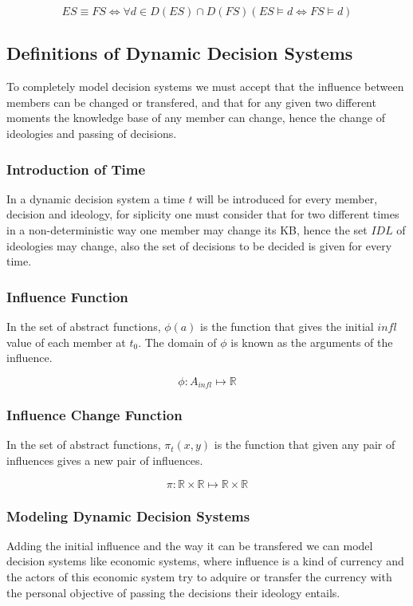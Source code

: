 $$ ES \equiv FS \iff \forall d \in D(ES) \cap D(FS) (ES \models d \iff FS \models d) $$

\subsection{Definitions of Dynamic Decision Systems}

To completely model decision systems we must accept that the influence between members can be changed or transfered, and that for any given two different moments the knowledge base of any member can change, hence the change of ideologies and passing of decisions.

\subsubsection{Introduction of Time}

In a dynamic decision system a time $t$ will be introduced for every member, decision and ideology, for siplicity one must consider that for two different times in a non-deterministic way one member may change its KB, hence the set $IDL$ of ideologies may change, also the set of decisions to be decided is given for every time.

\subsubsection{Influence Function} 

In the set of abstract functions, $\phi(a)$ is the function that gives the initial $infl$ value of each member at $t_{0}$. The domain of $\phi$ is known as the arguments of the influence.

$$\phi \colon A_{infl} \mapsto \mathbb{R}$$

\subsubsection{Influence Change Function}

In the set of abstract functions, $\pi_{t}(x, y)$ is the function that given any pair of influences gives a new pair of influences. 

$$\pi \colon \mathbb{R}\times\mathbb{R} \mapsto \mathbb{R}\times\mathbb{R}$$

\subsubsection{Modeling Dynamic Decision Systems}

Adding the initial influence and the way it can be transfered we can model decision systems like economic systems, where influence is a kind of currency and the actors of this economic system try to adquire or transfer the currency with the personal objective of passing the decisions their ideology entails.
